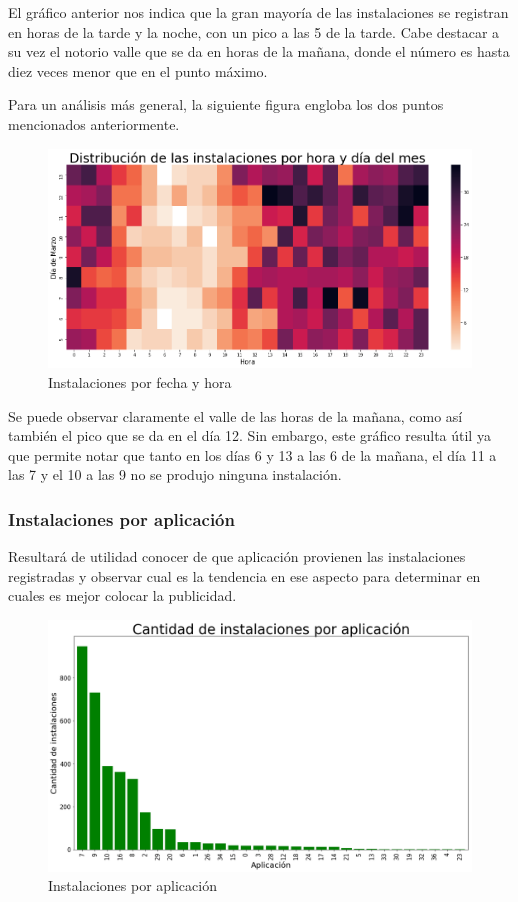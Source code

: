 \documentclass[a4paper, 12pt]{article}
\begin{document}
		 El gráfico anterior nos indica que la gran mayoría de las instalaciones se registran en horas de la tarde y la noche, con un pico a las 5 de la tarde. Cabe destacar a su vez el notorio valle que se da en horas de la mañana, donde el número es hasta diez veces menor que en el punto máximo.

		 Para un análisis más general, la siguiente figura engloba los dos puntos mencionados anteriormente.

		\FloatBarrier
		\begin{figure}[h]
			\centering
			\includegraphics[width=\textwidth]{images/installs/heatmapfecha.png}
			\caption{Instalaciones por fecha y hora}
		\end{figure}
		\FloatBarrier

		Se puede observar claramente el valle de las horas de la mañana, como así también el pico que se da en el día 12. Sin embargo, este gráfico resulta útil ya que permite notar que tanto en los días 6 y 13 a las 6 de la mañana, el día 11 a las 7 y el 10 a las 9 no se produjo ninguna instalación.

	\subsubsection{Instalaciones por aplicación} \label{aplicaciones}
		Resultará de utilidad conocer de que aplicación provienen las instalaciones registradas y observar cual es la tendencia en ese aspecto para determinar en cuales es mejor colocar la publicidad.

		\FloatBarrier
		\begin{figure}[h]
			\centering
			\includegraphics[width = \textwidth]{images/installs/aplicacionesvc.png}
			\caption{Instalaciones por aplicación}
		\end{figure}
		\FloatBarrier
\end{document}

